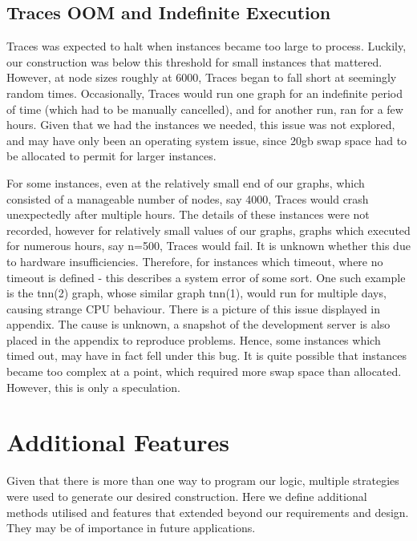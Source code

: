 \subsection{Traces OOM and Indefinite Execution}
Traces was expected to halt when instances became too large to process. Luckily, our construction was below this threshold for small instances that mattered. However, at node sizes roughly at 6000, Traces began to fall short at seemingly random times. Occasionally, Traces would run one graph for an indefinite period of time (which had to be manually cancelled), and for another run, ran for a few hours. Given that we had the instances we needed, this issue was not explored, and may have only been an operating system issue, since 20gb swap space had to be allocated to permit for larger instances.
\par
For some instances, even at the relatively small end of our graphs, which consisted of a manageable number of nodes, say 4000, Traces would crash unexpectedly after multiple hours. The details of these instances were not recorded, however for relatively small values of our graphs, graphs which executed for numerous hours, say n=500, Traces would fail. It is unknown whether this due to hardware insufficiencies. Therefore, for instances which timeout, where no timeout is defined - this describes a system error of some sort. One such example is the tnn(2) graph, whose similar graph tnn(1), would run for multiple days, causing strange CPU behaviour. There is a picture of this issue displayed in appendix. The cause is unknown, a snapshot of the development server is also placed in the appendix to reproduce problems. Hence, some instances which timed out, may have in fact fell under this bug. It is quite possible that instances became too complex at a point, which required more swap space than allocated. However, this is only a speculation.

\section{Additional Features}
Given that there is more than one way to program our logic, multiple strategies were used to generate our desired construction. Here we define additional methods utilised and features that extended beyond our requirements and design. They may be of importance in future applications.

